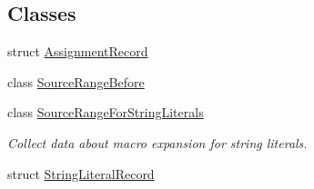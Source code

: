\subsection*{Classes}
\begin{DoxyCompactItemize}
\item 
struct \hyperlink{structclang_1_1tidy_1_1pagesjaunes_1_1_exec_s_q_l_prepare_to_function_call_1_1_assignment_record}{Assignment\+Record}
\item 
class \hyperlink{classclang_1_1tidy_1_1pagesjaunes_1_1_exec_s_q_l_prepare_to_function_call_1_1_source_range_before}{Source\+Range\+Before}
\item 
class \hyperlink{classclang_1_1tidy_1_1pagesjaunes_1_1_exec_s_q_l_prepare_to_function_call_1_1_source_range_for_string_literals}{Source\+Range\+For\+String\+Literals}
\begin{DoxyCompactList}\small\item\em Collect data about macro expansion for string literals. \end{DoxyCompactList}\item 
struct \hyperlink{structclang_1_1tidy_1_1pagesjaunes_1_1_exec_s_q_l_prepare_to_function_call_1_1_string_literal_record}{String\+Literal\+Record}
\end{DoxyCompactItemize}
